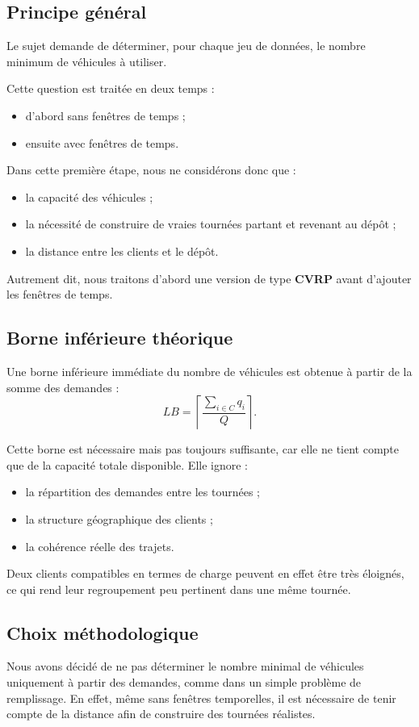 \documentclass[11pt,a4paper]{article}
\begin{document}
\subsection{Principe général}
Le sujet demande de déterminer, pour chaque jeu de données, le nombre minimum de véhicules à utiliser.

Cette question est traitée en deux temps :
\begin{itemize}
    \item d'abord sans fenêtres de temps ;
    \item ensuite avec fenêtres de temps.
\end{itemize}

Dans cette première étape, nous ne considérons donc que :
\begin{itemize}
    \item la capacité des véhicules ;
    \item la nécessité de construire de vraies tournées partant et revenant au dépôt ;
    \item la distance entre les clients et le dépôt.
\end{itemize}

Autrement dit, nous traitons d'abord une version de type \textbf{CVRP} avant d'ajouter les fenêtres de temps.

\subsection{Borne inférieure théorique}
Une borne inférieure immédiate du nombre de véhicules est obtenue à partir de la somme des demandes :
\[
LB = \left\lceil \frac{\sum_{i \in C} q_i}{Q} \right\rceil.
\]

Cette borne est nécessaire mais pas toujours suffisante, car elle ne tient compte que de la capacité totale disponible. Elle ignore :
\begin{itemize}
    \item la répartition des demandes entre les tournées ;
    \item la structure géographique des clients ;
    \item la cohérence réelle des trajets.
\end{itemize}

Deux clients compatibles en termes de charge peuvent en effet être très éloignés, ce qui rend leur regroupement peu pertinent dans une même tournée.

\subsection{Choix méthodologique}
Nous avons décidé de ne pas déterminer le nombre minimal de véhicules uniquement à partir des demandes, comme dans un simple problème de remplissage. En effet, même sans fenêtres temporelles, il est nécessaire de tenir compte de la distance afin de construire des tournées réalistes.
\end{document}
